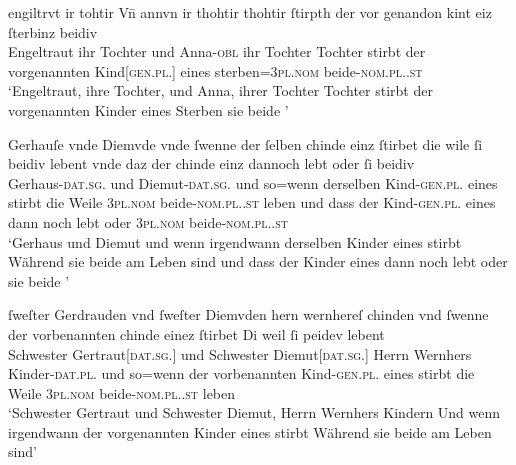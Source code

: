 \begin{exe}
\ex \label{ex:cao_beidiu_neutfem}
	\begin{xlist}
	\ex \label{ex:cao_beidiu_neutfem_1}
		\gll engiltrvt ir tohtir Vn̄ annvn ir thohtir thohtir
			\textelp{} ſtirpth der {vor genandon} kint eiz \textelp{}
			ſterbinz {beidiv \textelp{}} \\
			Engeltraut ihr Tochter und Anna-\textsc{obl} ihr Tochter Tochter {}
			stirbt der vorgenannten Kind[\textsc{gen.pl.\NeutF}] eines {}
			sterben=\textsc{3pl\subF.nom} beide-\textsc{nom.pl.\NeutF.st} \\
		\trans `Engeltraut, ihre Tochter, und Anna, ihrer Tochter Tochter
			\textelp{} stirbt der vorgenannten Kinder eines \textelp{}
			Sterben sie beide \textelp{}'
			\parencites(Nr. 629, St.~Gallen, 1284)[57,24--25]{cao2}

	\ex \label{ex:cao_beidiu_neutfem_2}
		\gll Gerhauſe vnde Diemvde \textelp{} vnde ſwenne {der ſelben}
			chinde einz ſtirbet \textelp{} die wile ſi
			beidiv lebent \textelp{} vnde daz der chinde einz
			dannoch lebt oder ſi beidiv \\
			Gerhaus-\textsc{dat.sg.\FemF} und Diemut-\textsc{dat.sg.\FemF} {} und so=wenn
			derselben Kind-\textsc{gen.pl.\NeutF} eines stirbt {} die Weile
			\textsc{3pl\subF.nom} beide-\textsc{nom.pl.\NeutF.st} leben {} und dass der
			Kind-\textsc{gen.pl.\NeutF} eines {dann noch} lebt oder \textsc{3pl\subF.nom}
			beide-\textsc{nom.pl.\NeutF.st} \\
		\trans `Gerhaus  und Diemut \textelp{} und wenn
			irgendwann derselben Kinder eines stirbt \textelp{} Während sie
			beide am Leben sind \textelp{} und dass der Kinder eines dann
			noch lebt oder sie beide \textelp{}'
			\parencites(Nr.~2719, Nürnberg, 1297)[96,43--97,9]{cao4}

	\ex \label{ex:cao_beidiu_neutfem_3}
		\gll ſweſter Gerdrauden vnd ſweſter Diemvden hern wernhereſ
			chinden \textelp{} vnd ſwenne der vorbenannten chinde
			einez ſtirbet \textelp{} Di weil ſi peidev
			lebent \\
			Schwester Gertraut[\textsc{dat.sg.\FemF}] und Schwester
			Diemut[\textsc{dat.sg.\FemF}] Herrn Wernhers Kinder-\textsc{dat.pl.\NeutF} {}
			und so=wenn der vorbenannten Kind-\textsc{gen.pl.\NeutF} eines stirbt
			{} die Weile \textsc{3pl\subF.nom} beide-\textsc{nom.pl.\NeutF.st} leben \\
		\trans `Schwester Gertraut und Schwester Diemut, Herrn Wernhers
			Kindern \textelp{} Und wenn irgendwann der vorgenannten Kinder eines
			stirbt \textelp{} Während sie beide am Leben sind'
			\parencites(Nr.~2960, Engelthal, Kr.~Nürnberger Land, 1298)[240,31--38]{cao4}
	\end{xlist}
\end{exe}

